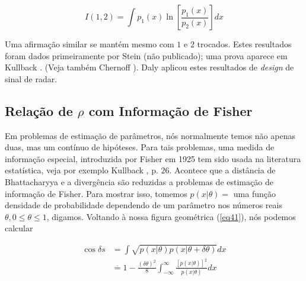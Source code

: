 \documentclass{sbrt2017port}
\begin{document}
\begin{equation*}
	I(1,2) = \int p_1(x) \ln [\frac{p_1(x)}{p_2(x)}]dx
\end{equation*}

Uma afirmação similar se mantém mesmo com $1$ e $2$ trocados. Estes resultados foram dados primeiramente por Stein (não publicado); uma prova aparece em Kullback \cite{r8}. (Veja também Chernoff \cite{r27}). Daly \cite{r28} aplicou estes resultados de \textit{design} de sinal de radar.

\subsection{Relação de $\rho$ com Informação de Fisher}

Em problemas de estimação de parâmetros, nós normalmente temos não apenas duas, mas um contínuo de hipóteses. Para tais problemas, uma medida de informação especial, introduzida por Fisher em 1925 tem sido usada na literatura estatística, veja por exemplo Kullback \cite{r8}, p. $26$. Acontece que a distância de Bhattacharyya e a divergência são reduzidas a problemas de estimação de informação de Fisher. Para mostrar isso, tomemos $p(x|\theta)=$ uma função densidade de probabilidade dependendo de um parâmetro nos números reais $\theta, 0 \leq \theta \leq 1$, digamos. Voltando à nossa figura geométrica (\ref{eq41}), nós podemos calcular

\begin{equation}\label{eq55}
	\begin{split}
	\cos \delta s & = \int \sqrt{p(x|\theta)p(x|\theta+ \delta\theta)}dx \\
	& \stackrel{.}{=} 1 - \frac{(\delta \theta)^2}{8} \int_{-\infty}^{\infty} \frac{[\dot{p}(x|\theta)]^2}{p(x|\theta)} dx
	\end{split}
\end{equation}
\end{document}
